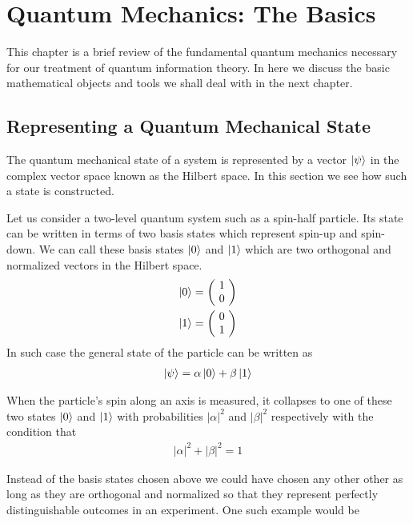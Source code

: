 \chapter{Quantum Mechanics: The Basics}

This chapter is a brief review of the fundamental quantum mechanics necessary for our treatment of quantum information theory. In here we discuss the basic mathematical objects and tools we shall deal with in the next chapter.

\section{Representing a Quantum Mechanical State}
\par The quantum mechanical state of a system is represented by a vector $\Ket{\psi}$ in the complex vector space known as the Hilbert space. In this section we see how such a state is constructed.
\par Let us consider a two-level quantum system such as a spin-half particle. Its state can be written in terms of two basis states which represent spin-up and spin-down. We can call these basis states $\Ket{0}$ and $\Ket{1}$ which are two orthogonal and normalized vectors in the Hilbert space.
\begin{align*}
\Ket{0} = \left(\! \begin{array}{c} 1 \\ 0 \end{array} \!\right) \\
\Ket{1} = \left(\! \begin{array}{c} 0 \\ 1 \end{array} \!\right)
\end{align*}
In such case the general state of the particle can be written as
\begin{align*}
\Ket{\psi} = \alpha \Ket{0} + \beta \Ket{1}
\end{align*}
\par When the particle's spin along an axis is measured, it collapses to one of these two states $\Ket{0}$ and $\Ket{1}$ with probabilities $|\alpha|^2$ and $|\beta|^2$ respectively with the condition that
\begin{align*}
|\alpha|^2 + |\beta|^2 = 1
\end{align*}
\par Instead of the basis states chosen above we could have chosen any other other as long as they are orthogonal and normalized so that they represent perfectly distinguishable outcomes in an experiment. One such example would be
